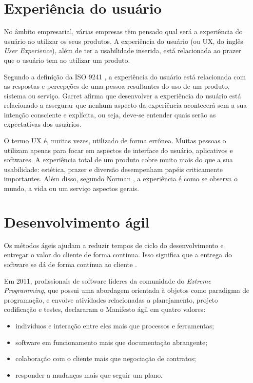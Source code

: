 \section{Experiência do usuário}

No âmbito empresarial, várias empresas têm pensado qual será a experiência do usuário ao utilizar os seus produtos. A experiência do usuário (ou UX, do inglês \textit{User Experience}), além de ter a usabilidade inserida, está relacionada ao prazer que o usuário tem ao utilizar um produto. 


Segundo a definição da ISO 9241 \cite{iso9241}, a experiência do usuário está relacionada com as respostas e percepções de uma pessoa resultantes do uso de um produto, sistema ou serviço. Garret \cite{garrett2010elements} afirma que desenvolver a experiência do usuário está relacionado a assegurar que nenhum aspecto da experiência acontecerá sem a sua intenção consciente e explícita, ou seja, deve-se entender quais serão as expectativas dos usuários. 

O termo UX é, muitas vezes, utilizado de forma errônea. Muitas pessoas o utilizam apenas para focar em aspectos de interface do usuário, aplicativos e softwares. A experiência total de um produto cobre muito mais do que a sua usabilidade: estética, prazer e diversão desempenham papéis criticamente importantes. Além disso, segundo Norman \cite{NormamVideo}, a experiência é como se observa o mundo, a vida ou um serviço aspectos gerais. 



\section{Desenvolvimento ágil}
Os métodos ágeis ajudam a reduzir tempos de ciclo do desenvolvimento e entregar o valor do cliente de forma contínua. Isso significa que a entrega do software se dá de forma contínua ao cliente \cite{manifestoAgil}.

Em 2011, profissionais de software líderes da comunidade do \textit{Extreme Programming}, que possui uma abordagem orientada à objetos como paradigma de programação, e envolve atividades relacionadas a planejamento, projeto codificação e testes, declararam o Manifesto ágil \cite{agile} em quatro valores:

\begin{itemize}

\item indivíduos e interação entre eles mais que processos e ferramentas;

\item software em funcionamento mais que documentação abrangente;

\item colaboração com o cliente mais que negociação de contratos;

\item responder a mudanças mais que seguir um plano.

\end{itemize}

